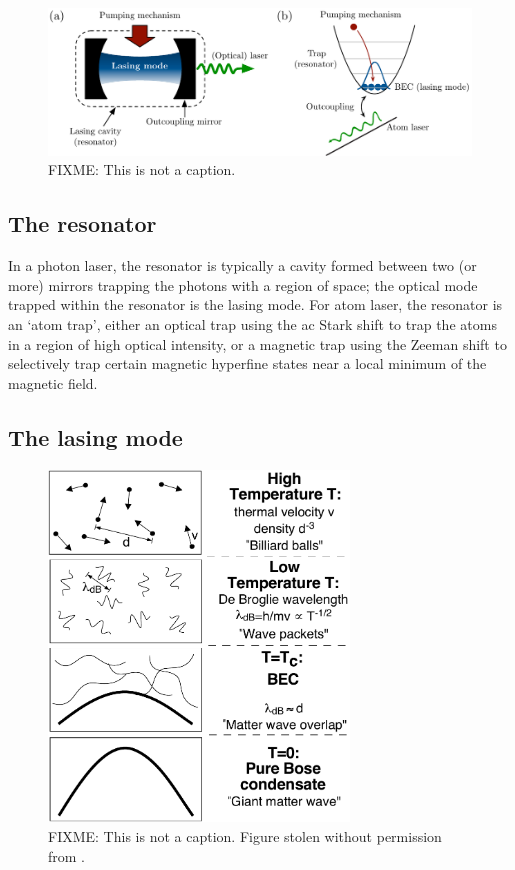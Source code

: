 \begin{figure}
    \centering
    \includegraphics[width=14cm]{LaserAtomLaserComparison}
    \caption{
        \label{Introduction:LaserAtomLaserComparison}
        FIXME: This is not a caption.
    }
\end{figure}

\subsection{The resonator}

In a photon laser, the resonator is typically a cavity formed between two (or more) mirrors trapping the photons with a region of space; the optical mode trapped within the resonator is the lasing mode.  For atom laser, the resonator is an `atom trap', either an optical trap using the ac Stark shift to trap the atoms in a region of high optical intensity, or a magnetic trap using the Zeeman shift to selectively trap certain magnetic hyperfine states near a local minimum of the magnetic field.

\subsection{The lasing mode}

\begin{figure}
    \centering
    \includegraphics[width=8cm]{WhatIsBEC}
    \caption{
        \label{Introduction:WhatIsBEC}
        FIXME: This is not a caption.  Figure stolen without permission from \citep{Ketterle:1999fk}.
    }
\end{figure}

